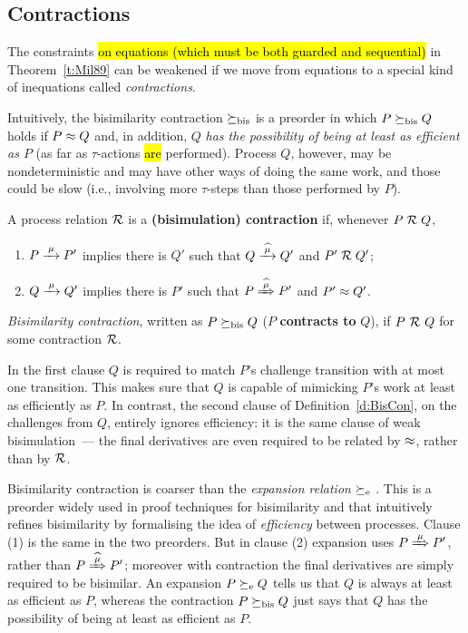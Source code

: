 \subsection{Contractions}
\label{s:mcontr}

The constraints \hl{on equations (which must be both guarded and
sequential)} in Theorem~\ref{t:Mil89} can be
weakened if we move from equations to a special kind of inequations called
  \emph{contractions}.

Intuitively, the bisimilarity contraction $\mathrel{\succeq_{\rm{bis}}}$ is a preorder in which 
$P \mathrel{\succeq_{\rm{bis}}} Q  $  holds  if $P \approx Q$ and, in addition, 
$Q$ \emph{has the possibility of being at least as efficient as $P$} (as far as
$\tau$-actions \hl{are} performed). 
Process $Q$, however, may be nondeterministic and may have other ways
of doing the same work, and those could be slow (i.e., involving
more $\tau$-steps than those performed by $P$).

\begin{definition}%
\label{d:BisCon}
A process relation ${{\cal R}}$ 
 is a \textbf{(bisimulation) contraction} if, whenever
 $P\mathrel{\cal R} Q$, %

\begin{enumerate}
\item   $P \arr\mu P'$ implies there is $Q'$ such that $Q \arcap \mu
  Q'$ and $P' \mathrel{\cal R} Q'$;
\item $Q \arr\mu Q'$   implies there is $P'$ such that $P \Arcap \mu
 P'$ and $P' \approx Q'$\enspace.
\end{enumerate}
\emph{Bisimilarity contraction}, written as $P \mathrel{\succeq_{\rm{bis}}} Q$ ($P$
\textbf{contracts to} $Q$), if $P\ {\cal R}\ Q$ for some contraction ${\cal R}$.
\end{definition}

In the first clause $Q$ is required to match $P$'s challenge
transition with at most one transition.
This makes sure that $Q$ is capable of mimicking $P$'s
work at least as efficiently as $P$. 
In contrast, the second clause of Definition~\ref{d:BisCon}, on the
challenges from $Q$, entirely ignores efficiency: it is the same
clause of  weak bisimulation~--- the final derivatives are even required
to be related  by $\approx$, rather than by ${\cal R}$.

Bisimilarity  contraction is coarser than 
 the \emph{expansion relation} 
$\mathrel{\succeq_{\rm{e}}}$ \cite{arun1992efficiency,sangiorgi2015equations}.
This is a
preorder widely used in proof techniques for bisimilarity and that 
intuitively refines bisimilarity by 
 formalising the idea of \emph{efficiency} between processes.
Clause (1) is the same in the two
preorders. But in clause (2) expansion uses 
$P \Arr \mu P'$, rather than $P \Arcap \mu P'$; 
 moreover with
contraction the final derivatives are simply required to be bisimilar.
An expansion 
$P \mathrel{\succeq_{\rm{e}}} Q$
tells us  that $Q$ is always at least as efficient as $P$, whereas  the
 contraction $P \mathrel{\succeq_{\rm{bis}}} Q$  just says that $Q$ has the  possibility of
being at least as efficient as $P$. 

